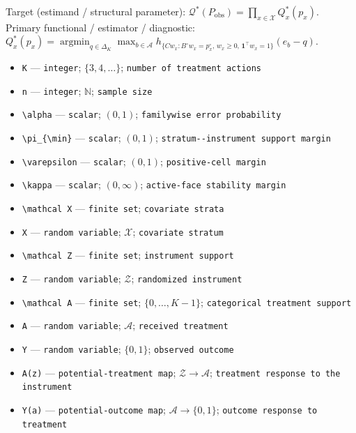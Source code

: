 \documentclass{article}
\begin{document}
Target (estimand / structural parameter): \(\mathcal Q^*(P_{\mathrm{obs}})=\prod_{x\in\mathcal X}Q_x^*(p_x)\).
Primary functional / estimator / diagnostic: \(Q_x^*(p_x)=\operatorname*{argmin}_{q\in\Delta_K}\max_{b\in\mathcal A}h_{\{Cw_x:B^\circ w_x=p_x^\circ,\,w_x\geq0,\,\mathbf 1^\top w_x=1\}}(e_b-q)\).
\begin{itemize}
  \item \texttt{K} --- \texttt{integer}; \(\{3,4,\ldots\}\); \texttt{number of treatment actions}
  \item \texttt{n} --- \texttt{integer}; \(\mathbb N\); \texttt{sample size}
  \item \texttt{\textbackslash{}\allowbreak{}alpha} --- \texttt{scalar}; \((0,1)\); \texttt{familywise error probability}
  \item \texttt{\textbackslash{}\allowbreak{}pi\_\allowbreak{}\{\textbackslash{}\allowbreak{}min\}\allowbreak{}} --- \texttt{scalar}; \((0,1)\); \texttt{stratum-\allowbreak{}-\allowbreak{}instrument support margin}
  \item \texttt{\textbackslash{}\allowbreak{}varepsilon} --- \texttt{scalar}; \((0,1)\); \texttt{positive-\allowbreak{}cell margin}
  \item \texttt{\textbackslash{}\allowbreak{}kappa} --- \texttt{scalar}; \((0,\infty)\); \texttt{active-\allowbreak{}face stability margin}
  \item \texttt{\textbackslash{}\allowbreak{}mathcal X} --- \texttt{finite set}; \texttt{covariate strata}
  \item \texttt{X} --- \texttt{random variable}; \(\mathcal X\); \texttt{covariate stratum}
  \item \texttt{\textbackslash{}\allowbreak{}mathcal Z} --- \texttt{finite set}; \texttt{instrument support}
  \item \texttt{Z} --- \texttt{random variable}; \(\mathcal Z\); \texttt{randomized instrument}
  \item \texttt{\textbackslash{}\allowbreak{}mathcal A} --- \texttt{finite set}; \(\{0,\ldots,K-1\}\); \texttt{categorical treatment support}
  \item \texttt{A} --- \texttt{random variable}; \(\mathcal A\); \texttt{received treatment}
  \item \texttt{Y} --- \texttt{random variable}; \(\{0,1\}\); \texttt{observed outcome}
  \item \texttt{A(z)} --- \texttt{potential-\allowbreak{}treatment map}; \(\mathcal Z\to\mathcal A\); \texttt{treatment response to the instrument}
  \item \texttt{Y(a)} --- \texttt{potential-\allowbreak{}outcome map}; \(\mathcal A\to\{0,1\}\); \texttt{outcome response to treatment}

\end{itemize}
\end{document}
